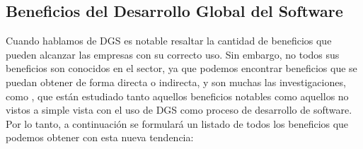 \subsection{Beneficios del Desarrollo Global del Software}
\label{sec:Beneficios}

Cuando hablamos de DGS es notable resaltar la cantidad de beneficios que pueden alcanzar las empresas con su correcto uso. Sin embargo, no todos sus beneficios son conocidos en el sector, ya que podemos encontrar beneficios que se puedan obtener de forma directa o indirecta, y son muchas las investigaciones, como \cite{aagerfalk2008benefits, conchuir2009global, conchuir2006exploring, vizcaino2015vision}, que están estudiado tanto aquellos beneficios notables como aquellos no vistos a simple vista con el uso de DGS como proceso de desarrollo de software. Por lo tanto, a continuación se formulará un listado de todos los beneficios que podemos obtener con esta nueva tendencia:

